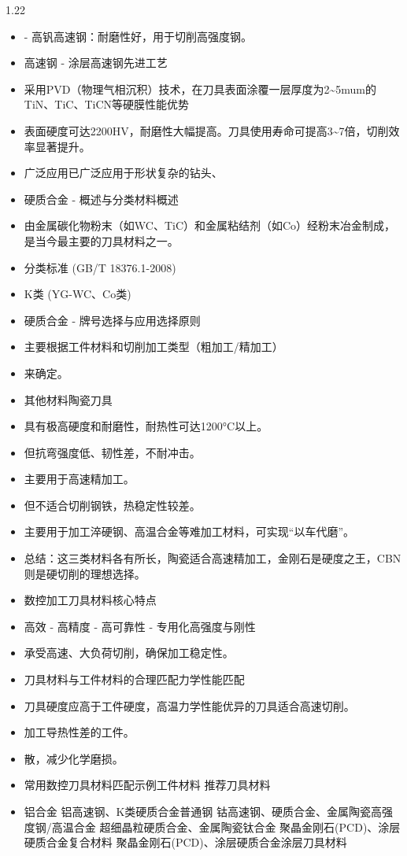 \documentclass[12pt,a4paper]{article}
\begin{document}
\begin{spacing}{1.22}
\begin{itemize}[leftmargin=2.2em,label=--]
  \item - 高钒高速钢：耐磨性好，用于切削高强度钢。
  \item 高速钢 - 涂层高速钢先进工艺
  \item 采用PVD（物理气相沉积）技术，在刀具表面涂覆一层厚度为2\textasciitilde{}5mum的TiN、TiC、TiCN等硬膜性能优势
  \item 表面硬度可达2200HV，耐磨性大幅提高。刀具使用寿命可提高3\textasciitilde{}7倍，切削效率显著提升。
  \item 广泛应用已广泛应用于形状复杂的钻头、
  \item 硬质合金 - 概述与分类材料概述
  \item 由金属碳化物粉末（如WC、TiC）和金属粘结剂（如Co）经粉末冶金制成，是当今最主要的刀具材料之一。
  \item 分类标准 (GB/T 18376.1-2008)
  \item K类 (YG-WC、Co类)
  \item 硬质合金 - 牌号选择与应用选择原则
  \item 主要根据工件材料和切削加工类型（粗加工/精加工）
  \item 来确定。
  \item 其他材料陶瓷刀具
  \item 具有极高硬度和耐磨性，耐热性可达1200°C以上。
  \item 但抗弯强度低、韧性差，不耐冲击。
  \item 主要用于高速精加工。
  \item 但不适合切削钢铁，热稳定性较差。
  \item 主要用于加工淬硬钢、高温合金等难加工材料，可实现“以车代磨”。
  \item 总结：这三类材料各有所长，陶瓷适合高速精加工，金刚石是硬度之王，CBN则是硬切削的理想选择。
  \item 数控加工刀具材料核心特点
  \item 高效 - 高精度 - 高可靠性 - 专用化高强度与刚性
  \item 承受高速、大负荷切削，确保加工稳定性。
  \item 刀具材料与工件材料的合理匹配力学性能匹配
  \item 刀具硬度应高于工件硬度，高温力学性能优异的刀具适合高速切削。
  \item 加工导热性差的工件。
  \item 散，减少化学磨损。
  \item 常用数控刀具材料匹配示例工件材料 推荐刀具材料
  \item 铝合金 铝高速钢、K类硬质合金普通钢 钴高速钢、硬质合金、金属陶瓷高强度钢/高温合金 超细晶粒硬质合金、金属陶瓷钛合金 聚晶金刚石(PCD)、涂层硬质合金复合材料 聚晶金刚石(PCD)、涂层硬质合金涂层刀具材料

\end{itemize}
\end{spacing}
\end{document}
